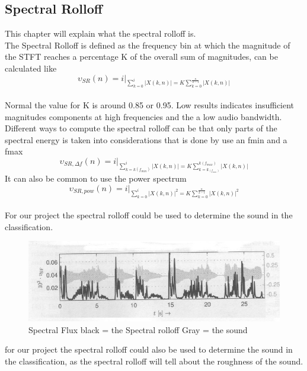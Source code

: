 \subsection{Spectral Rolloff}
This chapter will explain what the spectral rolloff is.\\
The Spectral Rolloff is defined as the frequency bin at which the magnitude of the STFT reaches a percentage K of the overall sum of magnitudes, can be calculated like\citep{ACA}\\
\begin{equation}\label{ eq:normal spectral rolloff}
	\upsilon_{SR}(n) = i \vert _{\displaystyle\sum_{k = 0}^i \vert X(k, n) \vert = K  \displaystyle\sum_{k = 0}^ {\frac{\kappa}{2-1}}\vert X(k, n) \vert}
\end{equation}
\\
Normal the value for K is around 0.85 or 0.95. Low results indicates insufficient magnitudes components at high frequencies and the a low audio bandwidth\citep{ACA}.\\
Different ways to compute the spectral rolloff can be that only parts of the spectral energy is taken into considerations that is done by use an fmin and a fmax\citep{ACA}
\begin{equation}\label{ eq: fmin and fmax spectral rolloff}
	\upsilon_{SR, \Delta f}(n) = i \vert _{\displaystyle\sum_{k = k(f_{min})}^i \vert X(k, n) \vert = K \displaystyle\sum_{k = k_(f_{min})}^ {k(f_{max})}\vert X(k, n) \vert}
\end{equation}
It can also be common to use the power spectrum
\begin{equation}\label{ eq:power spectral rolloff}
	\upsilon_{SR, pow}(n) = i \vert _{\displaystyle\sum_{k = 0}^i \vert X(k, n) \vert^2 = K \displaystyle\sum_{k= 0}^ {\frac{\kappa}{2-1}}\vert X(k, n) \vert^2}
\end{equation}
\\
For our project the spectral rolloff could be used to determine the sound in the classification. 

\begin{figure}[h]
	\begin{center}
		\includegraphics[scale = 0.5]{fig/spectral_rolloff.jpg}
		\caption{Spectral Flux black = the Spectral rolloff Gray = the sound \citep{ACA}}
		\label{Spectral rolloff pic}
	\end{center}
\end{figure}
for our project the spectral rolloff could also be used to determine the sound in the classification, as the spectral rolloff will tell about the roughness of the sound. 


